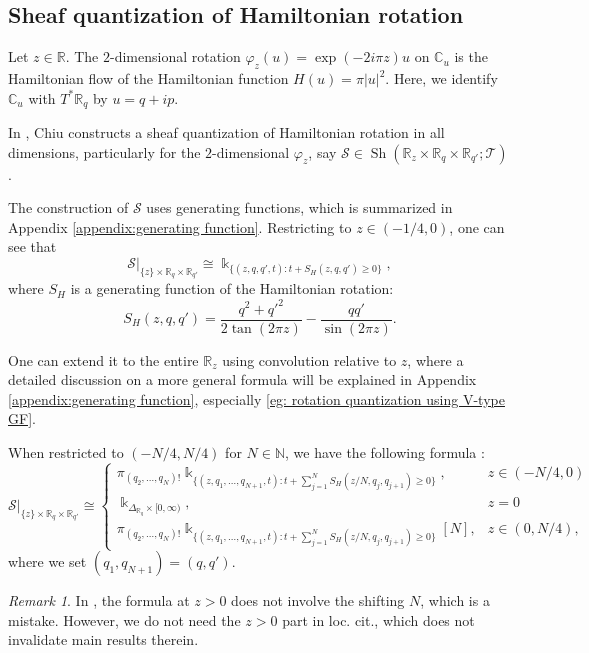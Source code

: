 \documentclass[11pt]{amsart}
\numberwithin{equation}{section}
\theoremstyle{plain}
\theoremstyle{definition}
\theoremstyle{remark}
\newtheorem{RMK}[rmk]{Remark}
\newcommand{\bC} { {\mathbb{C}}}
\newcommand{\bR} { {\mathbb{R}}}
\newcommand{\bN} { {\mathbb{N}}}
\newcommand{\sT} { {\mathscr{T}}}
\newcommand{\Sh} { {\operatorname{Sh}}}
\begin{document}
\subsection{Sheaf quantization of Hamiltonian rotation}
Let $z \in \bR$. The $2$-dimensional rotation $\varphi_z(u)=\exp{(-2i\pi z)}u$ on $\bC_u$ is the Hamiltonian flow of the Hamiltonian function $H(u)=\pi|u|^2 $. Here, we identify $\bC_u$ with $T^*\bR_q$ by $u=q+ip$.

In \cite[Proposition 3.10]{chiu2017}, Chiu constructs a sheaf quantization of Hamiltonian rotation in all dimensions, particularly for the $2$-dimensional  $\varphi_z$, say 
$\mathcal{S} \in \Sh(\bR_z\times \bR_{q}\times \bR_{q'}; \sT)$.

The construction of $\mathcal{S}$ uses generating functions, which is summarized in Appendix \ref{appendix:generating function}.
Restricting to $z \in (-1/4,0)$, one can see that 
\[ 
\mathcal{S}|_{\{z\}\times\bR_q \times \bR_{q'}}\cong {\Bbbk }_{\{(z,q,q',t):t+ S_{H}(z,q,q')\geq 0\}},   
\]
where $S_H$ is a generating function of the Hamiltonian rotation: 
\begin{equation}\label{equation: formula of S_H}
S_H(z,q,q')= \frac{q^2+{q'}^2}{2\tan(2\pi z)} -\frac{qq'}{\sin(2\pi z)}.    
\end{equation}

One can extend it to the entire $\bR_z$ using convolution relative to $z$, where a detailed discussion on a more general formula will be explained in Appendix \ref{appendix:generating function}, especially \autoref{eg: rotation quantization using V-type GF}. 

When restricted to $ (-N/4,N/4)$ for $N\in \bN$, we have the following formula \cite[Equation (3.2)]{Capacities2021}:
\begin{equation}\label{equation: formula of GF sheaf quantization}
\mathcal{S}|_{\{z\}\times\bR_{q} \times \bR_{q'}}\cong  \begin{cases}
     \pi_{(q_2,\dots,q_N)!}{\Bbbk }_{\{(z,q_1,\dots,q_{N+1},t):t+\sum_{j=1}^N S_{H}(z/N,q_j,q_{j+1})\geq 0\}}, &z\in (-N/4,0)\\
      {\Bbbk }_{\Delta_{\bR_{q}}\times [0,\infty)}, &z=0\\
     \pi_{(q_2,\dots,q_N)!}{\Bbbk }_{\{(z,q_1,\dots,q_{N+1},t):t+\sum_{j=1}^N S_{H}(z/N,q_j,q_{j+1})\geq 0\}}[N], &z\in (0,N/4),
 \end{cases}  
\end{equation}
where we set $(q_1,q_{N+1})=(q,q')$.
\begin{RMK}In \cite[Equation (3.2)]{Capacities2021}, the formula at $z>0$ does not involve the shifting $N$, which is a mistake. However, we do not need the $z>0$ part in loc. cit., which does not invalidate main results therein.
\end{RMK}
\end{document}
